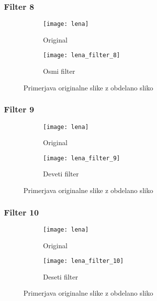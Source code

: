 \subsubsection*{Filter 8}
\begin{figure}[h]
    \centering
    \begin{subfigure}[b]{0.4\textwidth}
        \texttt{[image: lena]}
        \caption{Original}
    \end{subfigure}
    \begin{subfigure}[b]{0.4\textwidth}
        \texttt{[image: lena\_filter\_8]}
        \caption{Osmi filter}
    \end{subfigure}
    \caption{Primerjava originalne slike z obdelano sliko}
    \label{fig:lena_filter_8}
\end{figure}


\subsubsection*{Filter 9}
\begin{figure}[h]
    \centering
    \begin{subfigure}[b]{0.4\textwidth}
        \texttt{[image: lena]}
        \caption{Original}
    \end{subfigure}
    \begin{subfigure}[b]{0.4\textwidth}
        \texttt{[image: lena\_filter\_9]}
        \caption{Deveti filter}
    \end{subfigure}
    \caption{Primerjava originalne slike z obdelano sliko}
    \label{fig:lena_filter_9}
\end{figure}


\subsubsection*{Filter 10}
\begin{figure}[h]
    \centering
    \begin{subfigure}[b]{0.4\textwidth}
        \texttt{[image: lena]}
        \caption{Original}
    \end{subfigure}
    \begin{subfigure}[b]{0.4\textwidth}
        \texttt{[image: lena\_filter\_10]}
        \caption{Deseti filter}
    \end{subfigure}
    \caption{Primerjava originalne slike z obdelano sliko}
    \label{fig:lena_filter_10}
\end{figure}


